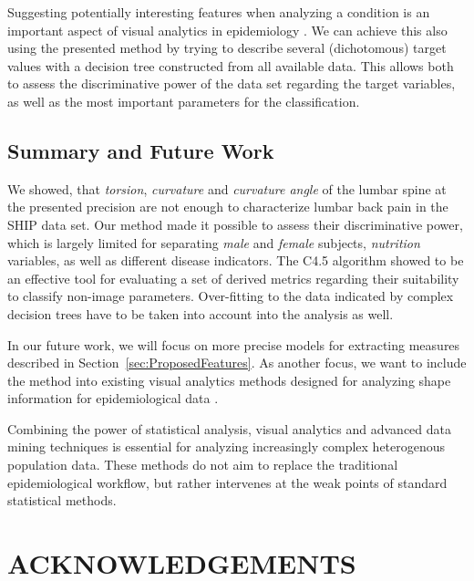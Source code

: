 \documentclass[a4paper,twoside]{style/article}
\begin{document}
Suggesting potentially interesting features when analyzing a condition is an important aspect of visual analytics in epidemiology \cite{Klemm2014VIS}.
We can achieve this also using the presented method by trying to describe several (dichotomous) target values with a decision tree constructed from all available data.
This allows both to assess the discriminative power of the data set regarding the target variables, as well as the most important parameters for the classification.

\subsection{Summary and Future Work}
\noindent We showed, that \emph{torsion}, \emph{curvature} and \emph{curvature angle} of the lumbar spine at the presented precision are not enough to characterize lumbar back pain in the SHIP data set.
Our method made it possible to assess their discriminative power, which is largely limited for separating \emph{male} and \emph{female} subjects, \emph{nutrition} variables, as well as different disease indicators.
The C4.5 algorithm showed to be an effective tool for evaluating a set of derived metrics regarding their suitability to classify non-image parameters.
Over-fitting to the data indicated by complex decision trees have to be taken into account into the analysis as well.

In our future work, we will focus on more precise models for extracting measures described in Section~\ref{sec:ProposedFeatures}.
As another focus, we want to include the method into existing visual analytics methods designed for analyzing shape information for epidemiological data \cite{Klemm2014VIS}.

Combining the power of statistical analysis, visual analytics and advanced data mining techniques is essential for analyzing increasingly complex heterogenous population data.
These methods do not aim to replace the traditional epidemiological workflow, but rather intervenes at the weak points of standard statistical methods.

\section*{\uppercase{Acknowledgements}}
\end{document}
